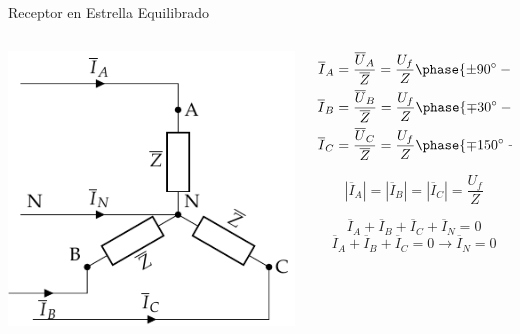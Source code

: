 \documentclass[aspectratio=169, usenames,svgnames,dvipsnames]{beamer}
\begin{document}
\begin{frame}[label={sec:org1a608a1}]{Receptor en Estrella Equilibrado}
\begin{columns}
\begin{column}{0.5\columnwidth}
\begin{center}
\includegraphics[width=.9\linewidth]{../figs/EstrellaEquilibrado_Receptor.pdf}
\end{center}
\end{column}

\begin{column}{0.5\columnwidth}
\begin{align*}
  \overline{I}_A &= \frac{\overline{U}_A}{\overline{Z}} = \frac{U_f}{Z}\phase{\ang{\pm 90} - \theta} \\
  \overline{I}_B &= \frac{\overline{U}_B}{\overline{Z}} = \frac{U_f}{Z}\phase{\ang{\mp 30} - \theta}\\
  \overline{I}_C &= \frac{\overline{U}_C}{\overline{Z}} = \frac{U_f}{Z}\phase{\ang{\mp 150} - \theta}
\end{align*}


\[
  \boxed{|\overline{I}_A| = |\overline{I}_B| = |\overline{I}_C| = \frac{U_f}{Z}}
\]

\[
  \overline{I}_A  + \overline{I}_B + \overline{I}_C + \overline{I}_N = 0
\]
\[
   \overline{I}_A  + \overline{I}_B + \overline{I}_C  = 0 \rightarrow \boxed{\overline{I}_N = 0}
\]
\end{column}
\end{columns}
\end{frame}
\end{document}
